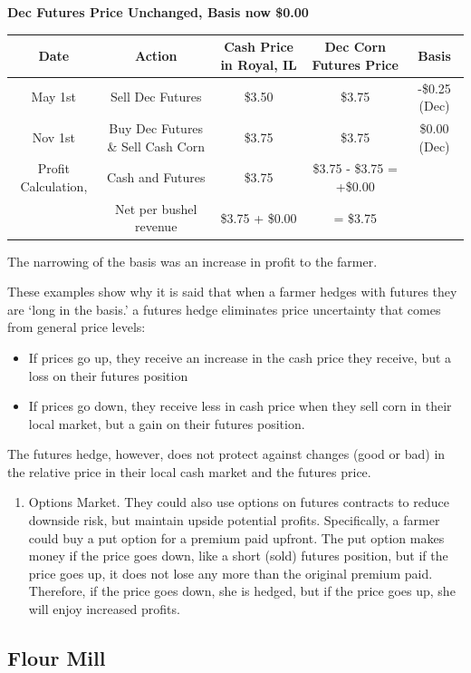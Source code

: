 \documentclass[
]{book}
\providecommand{\tightlist}{%
  \setlength{\itemsep}{0pt}\setlength{\parskip}{0pt}}
\begin{document}
\textbf{Dec Futures Price Unchanged, Basis now \$0.00}

\begin{longtable}[]{@{}ccccc@{}}
\toprule
Date & Action & Cash Price in Royal, IL & Dec Corn Futures Price & Basis\tabularnewline
\midrule
\endhead
May 1st & Sell Dec Futures & \$3.50 & \$3.75 & -\$0.25 (Dec)\tabularnewline
Nov 1st & Buy Dec Futures \& Sell Cash Corn & \$3.75 & \$3.75 & \$0.00 (Dec)\tabularnewline
Profit Calculation, & Cash and Futures & \$3.75 & \$3.75 - \$3.75 = +\$0.00 &\tabularnewline
& Net per bushel revenue & \$3.75 + \$0.00 & = \$3.75 &\tabularnewline
\bottomrule
\end{longtable}

The narrowing of the basis was an increase in profit to the farmer.

These examples show why it is said that when a farmer hedges with futures they are `long in the basis.' a futures hedge eliminates price uncertainty that comes from general price levels:

\begin{itemize}
\tightlist
\item
  If prices go up, they receive an increase in the cash price they receive, but a loss on their futures position
\item
  If prices go down, they receive less in cash price when they sell corn in their local market, but a gain on their futures position.
\end{itemize}

The futures hedge, however, does not protect against changes (good or bad) in the relative price in their local cash market and the futures price.

\begin{enumerate}
\def\labelenumi{\arabic{enumi}.}
\setcounter{enumi}{3}
\tightlist
\item
  Options Market. They could also use options on futures contracts to reduce downside risk, but maintain upside potential profits. Specifically, a farmer could buy a put option for a premium paid upfront. The put option makes money if the price goes down, like a short (sold) futures position, but if the price goes up, it does not lose any more than the original premium paid. Therefore, if the price goes down, she is hedged, but if the price goes up, she will enjoy increased profits.
\end{enumerate}

\hypertarget{flour-mill}{%
\subsection{Flour Mill}\label{flour-mill}}
\end{document}
